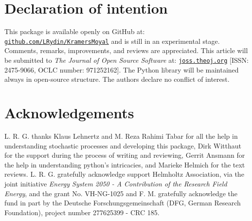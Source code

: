 \documentclass[showpacs,showkeys,10pt,onecolumn,superscriptaddress,notitlepage]{revtex4-1}
\begin{document}
\section{Declaration of intention}
This package is available openly on GitHub at: \texttt{\href{https://github.com/LRydin/KramersMoyal}{github.com/LRydin/KramersMoyal}} and is still in an experimental stage. Comments, remarks, improvements, and reviews are appreciated.
This article will be submitted to \textit{The Journal of Open Source Software} at: \texttt{\href{https://joss.theoj.org}{joss.theoj.org}} [ISSN: 2475-9066, OCLC number: 971252162].
The Python library will be maintained always in open-source structure.
The authors declare no conflict of interest.

\section{Acknowledgements}
L. R. G. thanks Klaus Lehnertz and M. Reza Rahimi Tabar for all the help in understanding stochastic processes and developing this package, Dirk Witthaut for the support during the process of writing and reviewing, Gerrit Ansmann for the help in understanding python's intricacies, and Marieke Helmich for the text reviews.
L. R. G. gratefully acknowledge support Helmholtz Association, via the joint initiative \emph{Energy System 2050 - A Contribution of the Research Field Energy}, and the grant No. VH-NG-1025 and F. M. gratefully acknowledge the fund in part by the Deutsche Forschungsgemeinschaft (DFG, German Research Foundation), project number 277625399 - CRC 185.


\end{document}
